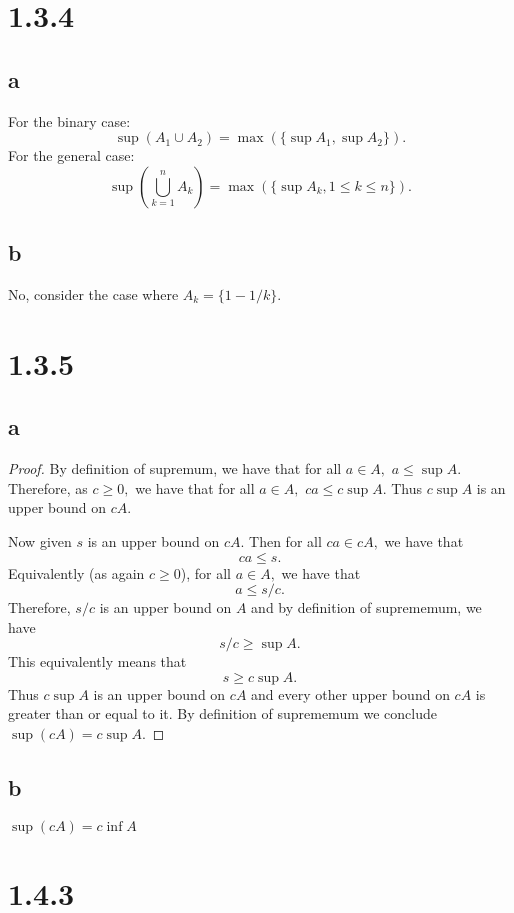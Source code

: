 \documentclass[10pt]{article}
\begin{document}
\section*{1.3.4}

\subsection*{a}
For the binary case:
\[\sup (A_1\cup A_2) = \max (\{\sup A_1, \sup A_2\}).\]
For the general case:
\[\sup \left (\bigcup_{k=1}^n A_k\right ) = \max( \{\sup A_k, 1 \le k\le n\}).\]

\subsection*{b}
No, consider the case where $A_k = \{1- 1/k\}$.

\section*{1.3.5}

\subsection*{a}
\begin{proof}
    By definition of supremum, we have that for all $a\in A,$ $a \le \sup A.$ Therefore, as $c \ge 0,$ we have that for all $a \in A,$ $ca \le c\sup A.$ Thus $c\sup A$ is an upper bound on $cA.$

    Now given $s$ is an upper bound on $cA$. Then for all $ca \in cA,$ we have that \[ca \le s.\]
    Equivalently (as again $c\ge 0$), for all $a\in A,$ we have that \[a \le s/c. \]
    Therefore, $s/c$ is an upper bound on $A$ and by definition of suprememum, we have
    \[s/c\ge \sup A.\] This equivalently means that
    \[s \ge c\sup A.\]
    Thus $c\sup A$ is an upper bound on $cA$ and every other upper bound on $cA$ is greater than or equal to it. By definition of suprememum we conclude $\sup (cA) = c\sup A$. 

\end{proof}

\subsection*{b}
$\sup(cA) = c\inf A$

\section*{1.4.3}
\end{document}
